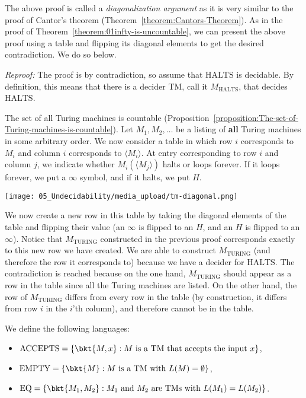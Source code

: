 \begin{note} \label{note:Diagonalization-argument-for-undecidability}
The above proof is called a \emph{diagonalization argument} as it is very similar to the proof of Cantor's theorem (Theorem~\ref{theorem:Cantors-Theorem}). As in the proof of Theorem~\ref{theorem:01infty-is-uncountable}, we can present the above proof using a table and flipping its diagonal elements to get the desired contradiction. We do so below.

\emph{Reproof:} The proof is by contradiction, so assume that $\text{HALTS}$ is decidable. By definition, this means that there is a decider TM, call it $M_\text{HALTS}$, that decides $\text{HALTS}$.

The set of all Turing machines is countable (Proposition~\ref{proposition:The-set-of-Turing-machines-is-countable}). Let $M_1, M_2, \ldots$ be a listing of {\bf all} Turing machines in some arbitrary order. We now consider a table in which row $i$ corresponds to $M_i$ and column $i$ corresponds to $\langle M_i \rangle$. At entry corresponding to row $i$ and column $j$, we indicate whether $M_i(\langle M_j \rangle)$ halts or loops forever. If it loops forever, we put a $\infty$ symbol, and if it halts, we put $H$.
\begin{center}
\texttt{[image: 05\_Undecidability/media\_upload/tm-diagonal.png]}
\end{center}
We now create a new row in this table by taking the diagonal elements of the table and flipping their value (an $\infty$ is flipped to an $H$, and an $H$ is flipped to an $\infty$). Notice that $M_\text{TURING}$ constructed in the previous proof corresponds exactly to this new row we have created. We are able to construct $M_\text{TURING}$ (and therefore the row it corresponds to) because we have a decider for $\text{HALTS}$. The contradiction is reached because on the one hand, $M_\text{TURING}$ should appear as a row in the table since all the Turing machines are listed. On the other hand, the row of $M_\text{TURING}$ differs from every row in the table (by construction, it differs from row $i$ in the $i$'th column), and therefore cannot be in the table.
\end{note}


\begin{definition} \label{definition:Languages-related-to-encodings-of-TMs}
We define the following languages:
\begin{itemize}
    \item[] $\text{ACCEPTS} = \{\bkt{M,x} : \text{$M$ is a TM that accepts the input $x$}\}$,
    \item[] $\text{EMPTY} = \{\bkt{M} : \text{$M$ is a TM with $L(M) = \emptyset$} \}$,
    \item[] $\text{EQ} = \{\bkt{M_1,M_2} : \text{$M_1$ and $M_2$ are TMs with $L(M_1) = L(M_2)$} \}$.
\end{itemize}
\end{definition}


